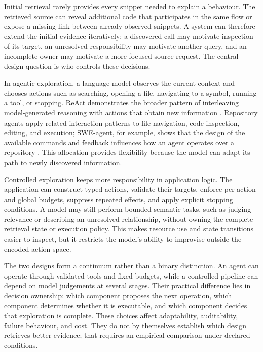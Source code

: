 Initial retrieval rarely provides every snippet needed to explain a behaviour. The retrieved source can reveal additional code that participates in the same flow or expose a missing link between already observed snippets. A system can therefore extend the initial evidence iteratively: a discovered call may motivate inspection of its target, an unresolved responsibility may motivate another query, and an incomplete owner may motivate a more focused source request. The central design question is who controls these decisions.

In agentic exploration, a language model observes the current context and chooses actions such as searching, opening a file, navigating to a symbol, running a tool, or stopping. ReAct demonstrates the broader pattern of interleaving model-generated reasoning with actions that obtain new information \cite{Yao2023ReAct}. Repository agents apply related interaction patterns to file navigation, code inspection, editing, and execution; SWE-agent, for example, shows that the design of the available commands and feedback influences how an agent operates over a repository \cite{Yang2024SWEAgent}. This allocation provides flexibility because the model can adapt its path to newly discovered information.

Controlled exploration keeps more responsibility in application logic. The application can construct typed actions, validate their targets, enforce per-action and global budgets, suppress repeated effects, and apply explicit stopping conditions. A model may still perform bounded semantic tasks, such as judging relevance or describing an unresolved relationship, without owning the complete retrieval state or execution policy. This makes resource use and state transitions easier to inspect, but it restricts the model's ability to improvise outside the encoded action space.

The two designs form a continuum rather than a binary distinction. An agent can operate through validated tools and fixed budgets, while a controlled pipeline can depend on model judgements at several stages. Their practical difference lies in decision ownership: which component proposes the next operation, which component determines whether it is executable, and which component decides that exploration is complete. These choices affect adaptability, auditability, failure behaviour, and cost. They do not by themselves establish which design retrieves better evidence; that requires an empirical comparison under declared conditions.


